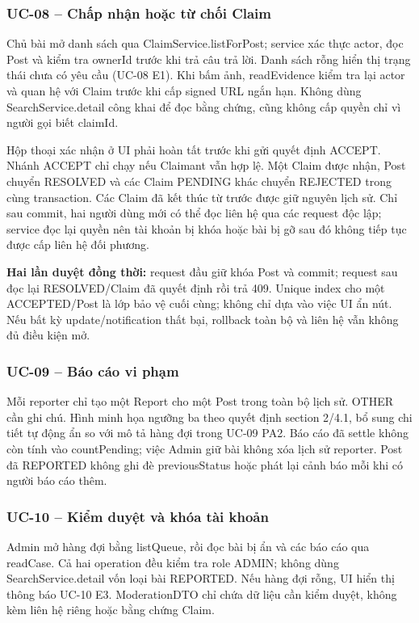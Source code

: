 \subsubsection{UC-08 -- Chấp nhận hoặc từ chối Claim}
Chủ bài mở danh sách qua ClaimService.listForPost; service xác thực actor, đọc Post và kiểm tra ownerId trước khi trả câu trả lời. Danh sách rỗng hiển thị trạng thái chưa có yêu cầu (UC-08 E1). Khi bấm ảnh, readEvidence kiểm tra lại actor và quan hệ với Claim trước khi cấp signed URL ngắn hạn. Không dùng SearchService.detail công khai để đọc bằng chứng, cũng không cấp quyền chỉ vì người gọi biết claimId.

Hộp thoại xác nhận ở UI phải hoàn tất trước khi gửi quyết định ACCEPT. Nhánh ACCEPT chỉ chạy nếu Claimant vẫn hợp lệ. Một Claim được nhận, Post chuyển RESOLVED và các Claim PENDING khác chuyển REJECTED trong cùng transaction. Các Claim đã kết thúc từ trước được giữ nguyên lịch sử. Chỉ sau commit, hai người dùng mới có thể đọc liên hệ qua các request độc lập; service đọc lại quyền nên tài khoản bị khóa hoặc bài bị gỡ sau đó không tiếp tục được cấp liên hệ đối phương.


\textbf{Hai lần duyệt đồng thời:} request đầu giữ khóa Post và commit; request sau đọc lại RESOLVED/Claim đã quyết định rồi trả 409. Unique index cho một ACCEPTED/Post là lớp bảo vệ cuối cùng; không chỉ dựa vào việc UI ẩn nút. Nếu bất kỳ update/notification thất bại, rollback toàn bộ và liên hệ vẫn không đủ điều kiện mở.

\subsubsection{UC-09 -- Báo cáo vi phạm}
Mỗi reporter chỉ tạo một Report cho một Post trong toàn bộ lịch sử. OTHER cần ghi chú. Hình minh họa ngưỡng ba theo quyết định section 2/4.1, bổ sung chi tiết tự động ẩn so với mô tả hàng đợi trong UC-09 PA2. Báo cáo đã settle không còn tính vào countPending; việc Admin giữ bài không xóa lịch sử reporter. Post đã REPORTED không ghi đè previousStatus hoặc phát lại cảnh báo mỗi khi có người báo cáo thêm.


\subsubsection{UC-10 -- Kiểm duyệt và khóa tài khoản}
Admin mở hàng đợi bằng listQueue, rồi đọc bài bị ẩn và các báo cáo qua readCase. Cả hai operation đều kiểm tra role ADMIN; không dùng SearchService.detail vốn loại bài REPORTED. Nếu hàng đợi rỗng, UI hiển thị thông báo UC-10 E3. ModerationDTO chỉ chứa dữ liệu cần kiểm duyệt, không kèm liên hệ riêng hoặc bằng chứng Claim.

